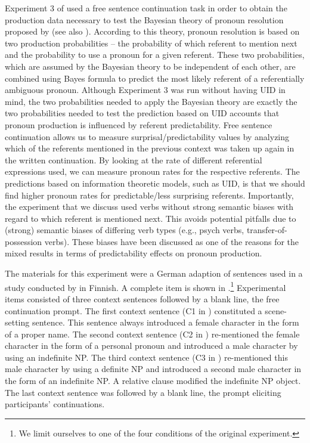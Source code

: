 \documentclass[output=paper,colorlinks,citecolor=brown]{langscibook}
\begin{document}
Experiment 3 of \citet{Bader::Portele-19-The-interpretation-of} used a free sentence continuation task in order to obtain the production data necessary to test the Bayesian theory of pronoun resolution proposed by \citet{Kehler::al-08} (see also \citealt{Kehler::Rohde-13}). According to this theory, pronoun resolution is based on two production probabilities -- the probability of which referent to mention next and the probability to use a pronoun for a given referent. These two probabilities, which are assumed by the Bayesian theory to be independent of each other, are combined using Bayes formula to predict the most likely referent of a referentially ambiguous pronoun. Although Experiment 3 was run without having UID in mind, the two probabilities needed to apply the Bayesian theory are exactly the two probabilities needed to test the prediction based on UID accounts that pronoun production is influenced by referent predictability. Free sentence continuation allows us to measure surprisal/predictability values by analyzing which of the referents mentioned in the previous context was taken up again in the written continuation. By looking at the rate of different referential expressions used, we can measure pronoun rates for the respective referents. The predictions based on information theoretic models, such as UID, is that we should find higher pronoun rates for predictable/less surprising referents. Importantly, the experiment that we discuss used verbs without strong semantic biases with regard to which referent is mentioned next. This avoids potential pitfalls due to (strong) semantic biases of differing verb types (e.g., psych verbs, transfer-of-possession verbs). These biases have been discussed as one of the reasons for the mixed results in terms of predictability effects on pronoun production. 

The materials for this experiment were a German adaption of sentences used in a study conducted by \citet{Kaiser::Trueswell-08} in Finnish. A complete item is shown in .\footnote{We limit ourselves to one of the four conditions of the original experiment.} Experimental items consisted of three context sentences followed by a blank line, the free continuation prompt. The first context sentence (C1 in ) constituted a scene-setting sentence. This sentence always introduced a female character in the form of a proper name. The second context sentence (C2 in ) re-mentioned the female character in the form of a personal pronoun and introduced a male character by using an indefinite NP. The third context sentence (C3 in ) re-mentioned this male character by using a definite NP and introduced a second male character in the form of an indefinite NP. A relative clause modified the indefinite NP object. The last context sentence was followed by a blank line, the prompt eliciting participants' continuations.
\end{document}

